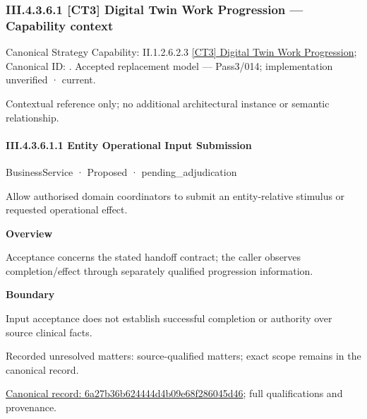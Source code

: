 \subsubsection*{III.4.3.6.1 [CT3] Digital Twin Work Progression — Capability context}
\label{navigation:III.4.3.6.1}

{\small Canonical Strategy Capability: II.1.2.6.2.3 \hyperref[element:251ce46fb18d4398ad49296eeea73bbc]{[CT3] Digital Twin Work Progression}; Canonical ID: \texttt{}. Accepted replacement model — Pass3/014; implementation unverified · current.}\par
Contextual reference only; no additional architectural instance or semantic relationship.\par
\paragraph*{III.4.3.6.1.1 Entity Operational Input Submission}
\label{navigation:III.4.3.6.1.1}

\label{element:6a27b36b624444d4b09e68f286045d46}
{\small BusinessService · Proposed · pending\_adjudication}\par

Allow authorised domain coordinators to submit an entity-relative stimulus or requested operational effect.



\textbf{Overview}



Acceptance concerns the stated handoff contract; the caller observes completion/effect through separately qualified progression information.



\textbf{Boundary}



Input acceptance does not establish successful completion or authority over source clinical facts.


{\small Recorded unresolved matters: source-qualified matters; exact scope remains in the canonical record.}\par
{\footnotesize \href{../../../../../../../../continuum/business/business-service/6a27b36b624444d4b09e68f286045d46.md}{Canonical record: 6a27b36b624444d4b09e68f286045d46}; full qualifications and provenance.}\par
